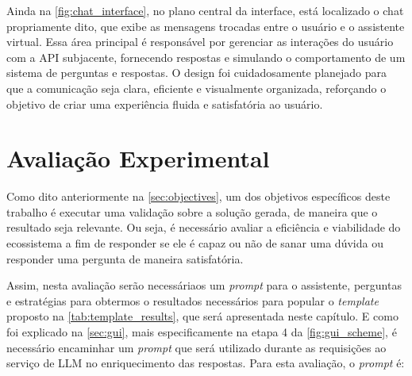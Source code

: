\documentclass[a4paper, 12pt]{article}
\begin{document}
    Ainda na \autoref{fig:chat_interface}, no plano central da interface, está localizado o chat propriamente dito, que exibe as mensagens trocadas entre o usuário e o assistente virtual. Essa área principal é responsável por gerenciar as interações do usuário com a API subjacente, fornecendo respostas e simulando o comportamento de um sistema de perguntas e respostas. O design foi cuidadosamente planejado para que a comunicação seja clara, eficiente e visualmente organizada, reforçando o objetivo de criar uma experiência fluida e satisfatória ao usuário.

    \section{Avaliação Experimental} \label{sec:experiment}

    Como dito anteriormente na \autoref{sec:objectives}, um dos objetivos específicos deste trabalho é executar uma validação sobre a solução gerada, de maneira que o resultado seja relevante. Ou seja, é necessário avaliar a eficiência e viabilidade do ecossistema a fim de responder se ele é capaz ou não de sanar uma dúvida ou responder uma pergunta de maneira satisfatória. 
    
    Assim, nesta avaliação serão necessáriaos um \textit{prompt} para o assistente, perguntas e estratégias para obtermos o resultados necessários para popular o \textit{template} proposto na \autoref{tab:template_results}, que será apresentada neste capítulo. E como foi explicado na \autoref{sec:gui}, mais especificamente na etapa 4 da \autoref{fig:gui_scheme}, é necessário encaminhar um \textit{prompt} que será utilizado durante as requisições ao serviço de LLM no enriquecimento das respostas. Para esta avaliação, o \textit{prompt} é:
\end{document}
